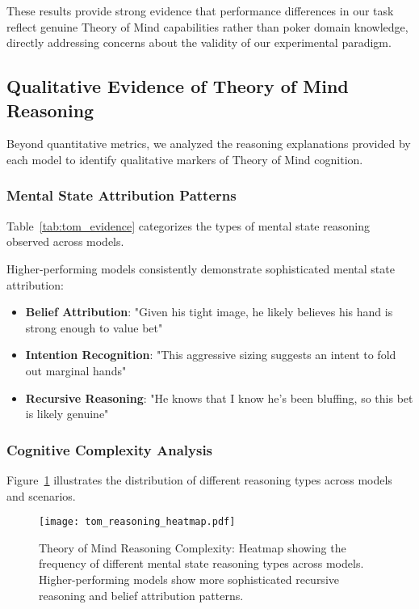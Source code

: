 These results provide strong evidence that performance differences in our task reflect genuine Theory of Mind capabilities rather than poker domain knowledge, directly addressing concerns about the validity of our experimental paradigm.

\subsection{Qualitative Evidence of Theory of Mind Reasoning}
\label{subsec:qualitative_evidence}

Beyond quantitative metrics, we analyzed the reasoning explanations provided by each model to identify qualitative markers of Theory of Mind cognition.

\subsubsection{Mental State Attribution Patterns}

Table~\ref{tab:tom_evidence} categorizes the types of mental state reasoning observed across models.



Higher-performing models consistently demonstrate sophisticated mental state attribution:

\begin{itemize}
    \item \textbf{Belief Attribution}: "Given his tight image, he likely believes his hand is strong enough to value bet"
    \item \textbf{Intention Recognition}: "This aggressive sizing suggests an intent to fold out marginal hands"
    \item \textbf{Recursive Reasoning}: "He knows that I know he's been bluffing, so this bet is likely genuine"
\end{itemize}

\subsubsection{Cognitive Complexity Analysis}

Figure~\ref{fig:tom_reasoning_heatmap} illustrates the distribution of different reasoning types across models and scenarios.

\begin{figure}[htbp]
\centering
\texttt{[image: tom\_reasoning\_heatmap.pdf]}
\caption{Theory of Mind Reasoning Complexity: Heatmap showing the frequency of different mental state reasoning types across models. Higher-performing models show more sophisticated recursive reasoning and belief attribution patterns.}
\label{fig:tom_reasoning_heatmap}
\end{figure}

